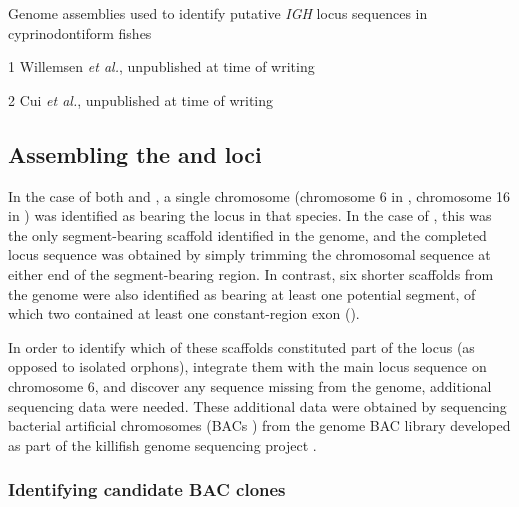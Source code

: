 \begin{table}
\centering
\caption{Genome assemblies used to identify putative \textit{IGH} locus sequences in cyprinodontiform fishes}
\begin{threeparttable}

\begin{tablenotes}
\item[1] Willemsen \textit{et al.}, unpublished at time of writing
\item[2] Cui \textit{et al.}, unpublished at time of writing
\end{tablenotes} %
\end{threeparttable}
\label{tab:cyprinodontiform-genomes}
\end{table}

\subsection{Assembling the \Nfu and \Xma \igh{} loci}
\label{sec:locus_assembly_methods}

In the case of both \nfu and \xma, a single chromosome (chromosome 6 in \Nfu, chromosome 16 in \Xma) was identified as bearing the \igh{} locus in that species. In the case of \Xma, this was the only segment-bearing scaffold identified in the genome, and the completed locus sequence was obtained by simply trimming the chromosomal sequence at either end of the segment-bearing region. In contrast, six shorter scaffolds from the \Nfu genome were also identified as bearing at least one potential \igh segment, of which two contained at least one constant-region exon (). 

In order to identify which of these scaffolds constituted part of the \Nfu \igh{} locus (as opposed to isolated orphons), integrate them with the main locus sequence on chromosome 6, and discover any sequence missing from the genome, additional sequencing data were needed. These additional data were obtained by sequencing bacterial artificial chromosomes (BACs \parencite{luo2001bac,saski2015bacprotocol}) from the \Nfu genome BAC library developed as part of the killifish genome sequencing project \parencite{reichwald2015genome}.

\subsubsection{Identifying candidate BAC clones}
\label{sec:bac-methods-ident}

